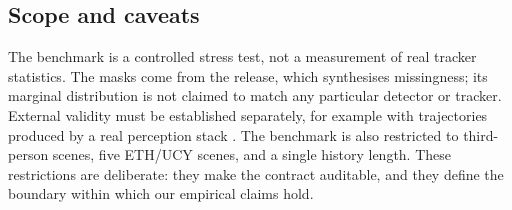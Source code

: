\subsection{Scope and caveats}
The benchmark is a controlled stress test, not a measurement of real tracker statistics. The masks come from the release, which synthesises missingness; its marginal distribution is not claimed to match any particular detector or tracker. External validity must be established separately, for example with trajectories produced by a real perception stack \cite{fujii2024realtraj}. The benchmark is also restricted to third-person scenes, five ETH/UCY scenes, and a single history length. These restrictions are deliberate: they make the contract auditable, and they define the boundary within which our empirical claims hold.
